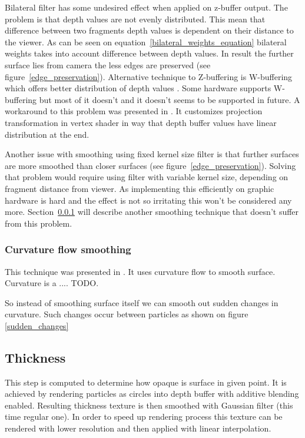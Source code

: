Bilateral filter has some undesired effect when applied on z-buffer output. The problem is that depth values are not evenly distributed. This mean that difference between two fragments depth values is dependent on their distance to the viewer. As can be seen on equation~\ref{bilateral_weights_equation} bilateral weights takes into account difference between depth values. In result the further surface lies from camera the less edges are preserved (see figure~\ref{edge_preservation}). Alternative technique to Z-buffering is W-buffering which offers better distribution of depth values \cite{Gregory2009}. Some hardware supports W-buffering but most of it doesn't and it doesn't seems to be supported in future. A workaround to this problem was presented in \cite{Dunlop2006}. It customizes projection transformation in vertex shader in way that depth buffer values have linear distribution at the end. 

Another issue with smoothing using fixed kernel size filter is that further surfaces are more smoothed than closer surfaces (see figure~\ref{edge_preservation}). Solving that problem would require using filter with variable kernel size, depending on fragment distance from viewer. As implementing this efficiently on graphic hardware is hard and the effect is not so irritating this won't be considered any more. Section~\ref{sec:curvatureflowsmoothing} will describe another smoothing technique that doesn't suffer from this problem. 

\subsubsection{Curvature flow smoothing} \label{sec:curvatureflowsmoothing}
This technique was presented in \cite{laanSainz2009}. It uses curvature flow to smooth surface. Curvature is a .... TODO.

So instead of smoothing surface itself we can smooth out sudden changes in curvature. Such changes occur between particles as shown on figure \ref{sudden_changes}


\subsection{Thickness} \label{sec:thickness}
This step is computed to determine how opaque is surface in given point. It is achieved by rendering particles as circles into depth buffer with additive blending enabled. Resulting thickness texture is then smoothed with Gaussian filter (this time regular one). In order to speed up rendering process this texture can be rendered with lower resolution and then applied with linear interpolation. 

